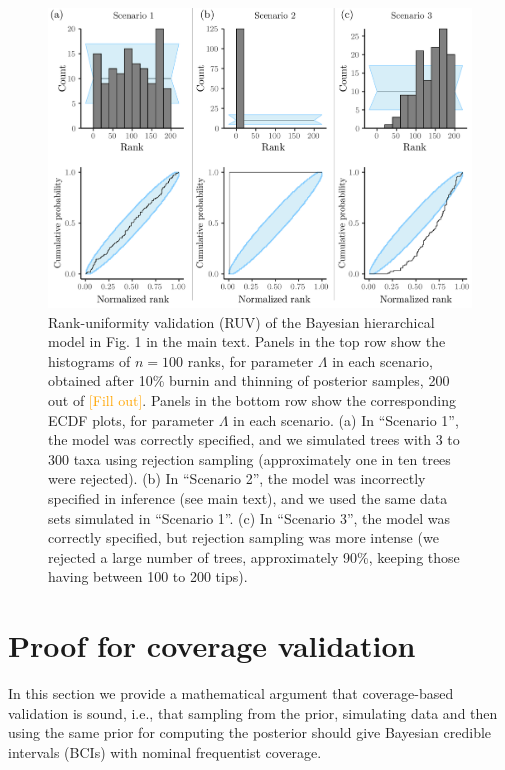 \documentclass[oneside]{article}
\begin{document}
\begin{figure}[!ht]
   \includegraphics[width=\linewidth]{../figures/sbc_Yule_lambda_manual.pdf}
  \caption{Rank-uniformity validation (RUV) of the Bayesian hierarchical model in Fig. 1 in the main text.
    Panels in the top row show the histograms of $n=100$ ranks, for parameter $\Lambda$ in each scenario, obtained after 10\% burnin and thinning of posterior samples, 200 out of \textcolor{orange}{[Fill out]}.
    Panels in the bottom row show the corresponding ECDF plots, for parameter $\Lambda$ in each scenario.
    (a) In ``Scenario 1'', the model was correctly specified, and we simulated trees with 3 to 300 taxa using rejection sampling (approximately one in ten trees were rejected).
    (b) In ``Scenario 2'', the model was incorrectly specified in inference (see main text), and we used the same data sets simulated in ``Scenario 1''.
    (c) In ``Scenario 3'', the model was correctly specified, but rejection sampling was more intense (we rejected a large number of trees, approximately 90\%, keeping those having between 100 to 200 tips).
   }
  \label{fig:ruv_yule_lambda}
\end{figure}


\newpage
\section{Proof for coverage validation}
 \label{appendix::sec:proofs}

In this section we provide a mathematical argument that coverage-based validation is sound,  i.e., that sampling from the prior, simulating data and then using the same prior for computing the posterior should give Bayesian credible intervals (BCIs) with nominal frequentist coverage.
\end{document}
